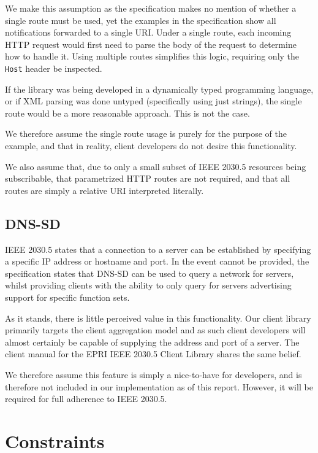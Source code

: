 We make this assumption as the specification makes no mention of whether a single route must be used, yet the examples in the specification show all notifications forwarded to a single URI. Under a single route, each incoming HTTP request would first need to parse the body of the request to determine how to handle it. Using multiple routes simplifies this logic, requiring only the \texttt{Host} header be inspected. 

If the library was being developed in a dynamically typed programming language, or if XML parsing was done untyped (specifically using just strings), the single route would be a more reasonable approach. This is not the case.

We therefore assume the single route usage is purely for the purpose of the example, and that in reality, client developers do not desire this functionality.

We also assume that, due to only a small subset of IEEE 2030.5 resources being subscribable, that parametrized HTTP routes are not required, and that all routes are simply a relative URI interpreted literally.

\subsection{DNS-SD}
IEEE 2030.5 states that a connection to a server can be established by specifying a specific IP address or hostname and port. In the event cannot be provided, the specification states that DNS-SD can be used to query a network for servers, whilst providing clients with the ability to only query for servers advertising support for specific function sets. 

As it stands, there is little perceived value in this functionality. Our client library primarily targets the client aggregation model and as such client developers will almost certainly be capable of supplying the address and port of a server.
The client manual for the EPRI IEEE 2030.5 Client Library shares the same belief. \cite{eprimanual}

We therefore assume this feature is simply a nice-to-have for developers, and is therefore not included in our implementation as of this report. However, it will be required for full adherence to IEEE 2030.5.

\section{Constraints}


